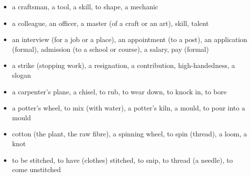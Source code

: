 \begin{itemize}
\raggedright
  \item a craftsman, a tool, a skill, to shape, a mechanic
  \item a colleague, an officer, a master (of a craft or an art), skill, talent
  \item an interview (for a job or a place), an appointment (to a post), an application (formal), admission (to a school or course), a salary, pay (formal)
  \item a strike (stopping work), a resignation, a contribution, high-handedness, a slogan
  \item a carpenter's plane, a chisel, to rub, to wear down, to knock in, to bore
  \item a potter's wheel, to mix (with water), a potter's kiln, a mould, to pour into a mould
  \item cotton (the plant, the raw fibre), a spinning wheel, to spin (thread), a loom, a knot
  \item to be stitched, to have (clothes) stitched, to snip, to thread (a needle), to come unstitched
\end{itemize}

